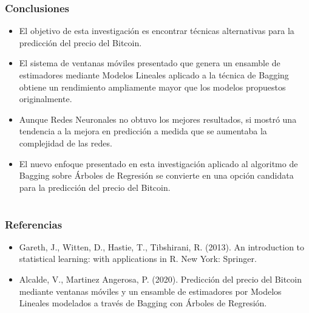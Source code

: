 \documentclass{beamer}
\begin{document}
\begin{frame}[t]
\frametitle{Conclusiones}
\vfill
\begin{itemize}
\item
El objetivo de esta investigación es encontrar técnicas alternativas para la predicción del precio del Bitcoin.
\item
El sistema de ventanas móviles presentado que genera un ensamble de estimadores mediante Modelos Lineales aplicado a la técnica de Bagging obtiene un rendimiento ampliamente mayor que los modelos propuestos originalmente.
\item
Aunque Redes Neuronales no obtuvo los mejores resultados, si mostró una tendencia a la mejora en predicción a medida que se aumentaba la complejidad de las redes. 
\item
El nuevo enfoque presentado en esta investigación aplicado al algoritmo de Bagging sobre Árboles de Regresión se convierte en una opción candidata para la predicción del precio del Bitcoin.
\end{itemize}

\vfill
\end{frame}


\section*{ }
\begin{frame}[t]
\frametitle{Referencias}
 
\begin{itemize}
\item
Gareth, J., Witten, D., Hastie, T., Tibshirani, R. (2013). 
{An introduction to statistical learning: with applications in R.}
New York: Springer.
\item
Alcalde, V., Martinez Angerosa, P. (2020). 
{Predicción del precio del Bitcoin mediante ventanas móviles y un ensamble de estimadores por Modelos Lineales modelados a través de Bagging con Árboles de Regresión.}
\end{itemize}
\end{frame}
\end{document}
